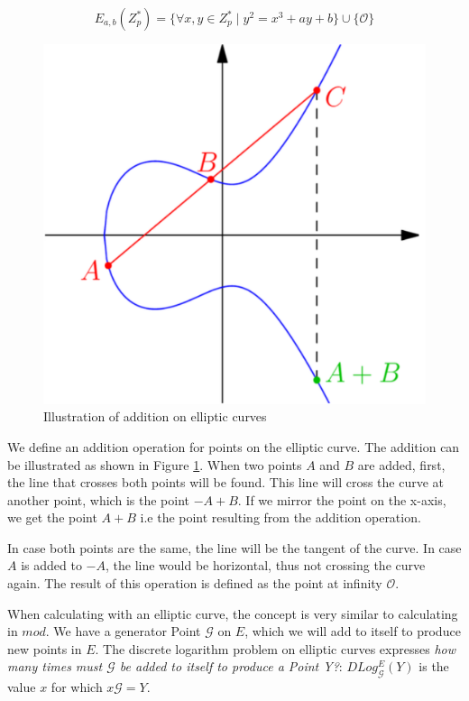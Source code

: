 $$
    E_{a,b}(Z_p^*) = \{ \forall x,y \in Z_p^* \; | \; y^2 = x^3 + ay + b \} \cup \{ \mathcal{O} \}
$$

\begin{figure}
    \center
    \includegraphics[width=\linewidth]{gfx/elliptic_curves_addition.png}
    \caption{Illustration of addition on elliptic curves}
    \label{fig:ell_curves_add}
\end{figure}

We define an addition operation for points on the elliptic curve.
The addition can be illustrated as shown in Figure \ref{fig:ell_curves_add}.
When two points $A$ and $B$ are added, first, the line that crosses both points will be found.
This line will cross the curve at another point, which is the point $-A+B$.
If we mirror the point on the x-axis, we get the point $A+B$ i.e the point resulting from the addition operation.

In case both points are the same, the line will be the tangent of the curve.
In case $A$ is added to $-A$, the line would be horizontal, thus not crossing the curve again.
The result of this operation is defined as the point at infinity $\mathcal{O}$.

When calculating with an elliptic curve, the concept is very similar to calculating in $mod$.
We have a generator Point $\mathcal{G}$ on $E$, which we will add to itself to produce new points in $E$.
The discrete logarithm problem on elliptic curves expresses \textit{how many times must $\mathcal{G}$ be added to itself to produce a Point Y?}:
$DLog_{\mathcal{G}}^{E}(Y)$ is the value $x$ for which $x\mathcal{G} = Y$.

